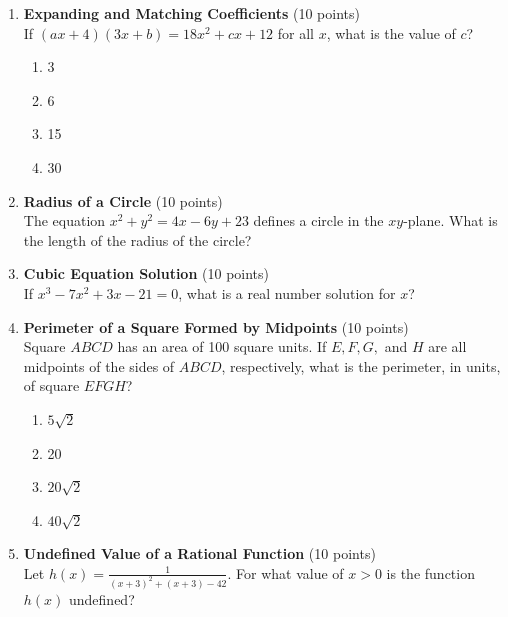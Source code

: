 \begin{enumerate}
  \newpage

  \item \textbf{Expanding and Matching Coefficients} (10 points)\\
  If $(a x + 4)(3 x + b) = 18 x^2 + c x + 12$ for all $x$, what is the value of $c$?
  \begin{enumerate}[label=(\Alph*)]
    \item 3
    \item 6
    \item 15
    \item 30
  \end{enumerate}
  \begin{subanswer}
  \end{subanswer}

  \item \textbf{Radius of a Circle} (10 points)\\
  The equation $x^2 + y^2 = 4x - 6y + 23$ defines a circle in the $xy$-plane. What is the length of the radius of the circle?
  \begin{subanswer}
  \end{subanswer}

  \item \textbf{Cubic Equation Solution} (10 points)\\
  If $x^3 - 7x^2 + 3x - 21 = 0$, what is a real number solution for $x$?
  \begin{subanswer}
  \end{subanswer}

  \item \textbf{Perimeter of a Square Formed by Midpoints} (10 points)\\
  Square $ABCD$ has an area of 100 square units. If $E, F, G,$ and $H$ are all midpoints of the sides of $ABCD$, respectively, what is the perimeter, in units, of square $EFGH$?
  \begin{enumerate}[label=(\Alph*)]
    \item $5\sqrt{2}$
    \item 20
    \item $20\sqrt{2}$
    \item $40\sqrt{2}$
  \end{enumerate}
  \begin{subanswer}
  \end{subanswer}

  \item \textbf{Undefined Value of a Rational Function} (10 points)\\
  Let $h(x) = \frac{1}{(x+3)^2 + (x+3) - 42}$. For what value of $x > 0$ is the function $h(x)$ undefined?
  \begin{subanswer}
  \end{subanswer}




\end{enumerate}
